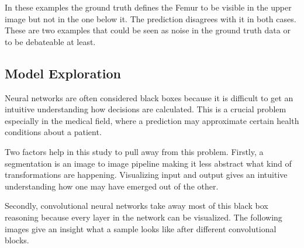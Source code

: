 In these examples the ground truth defines the Femur to be visible in the upper image but not in the one below it. The prediction disagrees with it in both cases. These are two examples that could be seen as noise in the ground truth data or to be debateable at least.

\subsection{Model Exploration}

Neural networks are often considered black boxes because it is difficult to get an intuitive understanding how decisions are calculated. This is a crucial problem especially in the medical field, where a prediction may approximate certain health conditions about a patient.

Two factors help in this study to pull away from this problem. Firstly, a segmentation is an image to image pipeline making it less abstract what kind of transformations are happening. Visualizing input and output gives an intuitive understanding how one may have emerged out of the other.

Secondly, convolutional neural networks take away most of this black box reasoning \cite{Chollet2017} because every layer in the network can be visualized. The following images give an insight what a sample looks like after different convolutional blocks.

